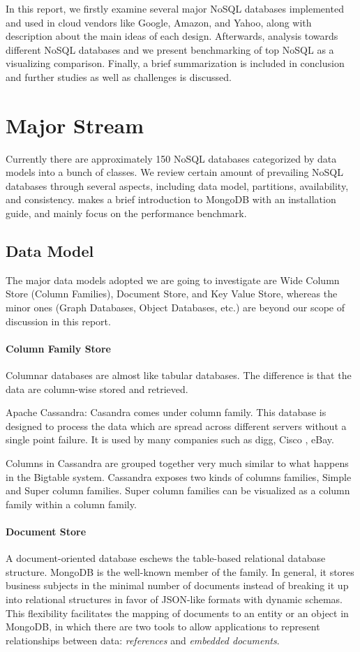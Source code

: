 \documentclass[12pt,letter]{article}
\begin{document}
In this report, we firstly examine several major NoSQL databases implemented and used in cloud vendors like Google, Amazon, and Yahoo, along with description about the main ideas of each design. Afterwards, analysis towards different NoSQL databases and we present benchmarking of top NoSQL as a visualizing comparison. Finally, a brief summarization is included in conclusion and further studies as well as challenges is discussed.

\section{Major Stream}
Currently there are approximately 150 NoSQL databases categorized by data models into a bunch of classes.\citep{Unknown2012} We review certain amount of prevailing NoSQL databases through several aspects, including data model, partitions, availability, and consistency. \citep{Suter2012} makes a brief introduction to MongoDB with an installation guide, and mainly focus on the performance benchmark.

\subsection{Data Model}
The major data models adopted we are going to investigate are Wide Column Store (Column Families), Document Store, and Key Value Store, whereas the minor ones (Graph Databases, Object Databases, etc.) are beyond our scope of discussion in this report.

\paragraph*{Column Family Store}
Columnar databases are almost like tabular databases. The difference is that the data are  column-wise stored and retrieved.

Apache Cassandra: Casandra comes under column family. This database is designed to process the data which  are spread across different servers without a single point failure. It is used by many companies such as digg, Cisco , eBay.

Columns in Cassandra are grouped together very much similar to what happens in the Bigtable\citep{Chang2006} system. Cassandra exposes two kinds of columns families, Simple and Super column families. Super column families can be visualized as a column family within a column family.\citep{LakshamAvinash2010}

\paragraph*{Document Store}
A document-oriented database eschews the table-based relational database structure. MongoDB is the well-known member of the family. In general, it stores business subjects in the minimal number of documents instead of breaking it up into relational structures\citep{Hoberman2014} in favor of JSON-like formats with dynamic schemas.\citep{Suter2012} This flexibility facilitates the mapping of documents to an entity or an object in MongoDB, in which there are two tools to allow applications to represent relationships between data: \textit{references} and \textit{embedded documents}.\citep{MongoDBInc.2009}
\end{document}
